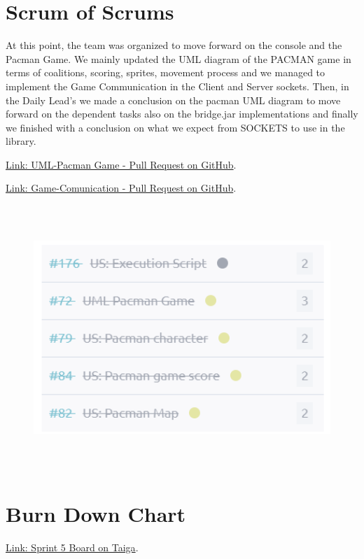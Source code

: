 
\hypertarget{sos-s3} {
\section{Scrum of Scrums}\label{Scrum of Scrums} 
At this point, the team was organized to move forward on the console and the Pacman Game.
We mainly updated the UML diagram of the PACMAN game in terms of coalitions, scoring, sprites, movement process and we managed to implement the Game Communication in the Client and Server sockets. Then, in the Daily Lead's we made a conclusion on the pacman UML diagram to move forward on the dependent tasks also on the bridge.jar implementations and finally we finished with a conclusion on what we expect from SOCKETS to use in the library. 
}

\href{https://github.com/Pending-Name-21/arquitecture/pull/11}{Link: UML-Pacman Game - Pull Request on GitHub}.

\href{https://github.com/Pending-Name-21/arquitecture/pull/17}{Link: Game-Comunication - Pull Request on GitHub}.

\begin{figure}
\centering
\includegraphics[width=16cm, height=10cm]{./assets/US-Sprint5.png}
\end{figure}

\hypertarget{burndownchart-s3}{
\section{Burn Down Chart}\label{Burn Down Chart S3}}
\href{https://tree.taiga.io/project/joseluis-teran-coffeetime/taskboard/sprint-5-3817}{Link: Sprint 5 Board on Taiga}.

